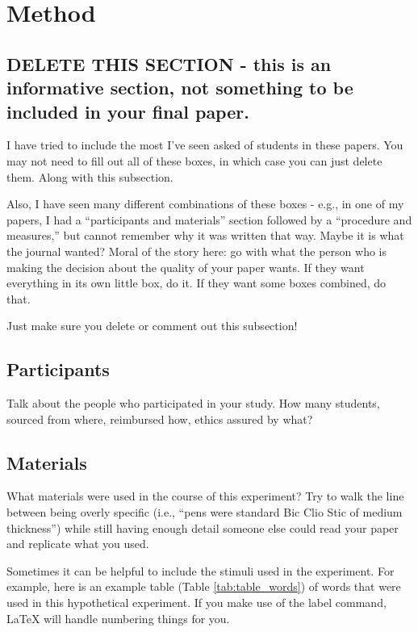 \documentclass[doc,12pt,floatsintext]{apa7}
\begin{document}
\section{Method}

\subsection{DELETE THIS SECTION - this is an informative section, not something to be included in your final paper.}

I have tried to include the most I've seen asked of students in these papers. You may not need to fill out all of these boxes, in which case you can just delete them. Along with this subsection.

Also, I have seen many different combinations of these boxes - e.g., in one of my papers, I had a ``participants and materials'' section followed by a ``procedure and measures,'' but cannot remember why it was written that way. Maybe it is what the journal wanted? Moral of the story here: go with what the person who is making the decision about the quality of your paper wants. If they want everything in its own little box, do it. If they want some boxes combined, do that.

Just make sure you delete or comment out this subsection!

\subsection{Participants}

Talk about the people who participated in your study. How many students, sourced from where, reimbursed how, ethics assured by what?

\subsection{Materials}

What materials were used in the course of this experiment? Try to walk the line between being overly specific (i.e., ``pens were standard Bic Clio Stic of medium thickness'') while still having enough detail someone else could read your paper and replicate what you used.

Sometimes it can be helpful to include the stimuli used in the experiment. For example, here is an example table (Table \ref{tab:table_words}) of words that were used in this hypothetical experiment. If you make use of the label command, \LaTeX{} will handle numbering things for you.
\end{document}
